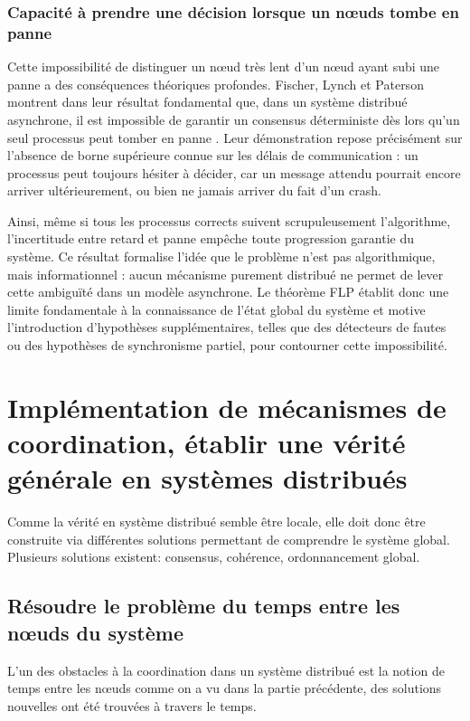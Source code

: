 \documentclass[12pt,a4paper]{article}
\begin{document}
\subsubsection{Capacité à prendre une décision lorsque un nœuds tombe en panne}

Cette impossibilité de distinguer un nœud très lent d’un nœud ayant subi une panne a des conséquences théoriques profondes. Fischer, Lynch et Paterson montrent dans leur résultat fondamental que, dans un système distribué asynchrone, il est impossible de garantir un consensus déterministe dès lors qu’un seul processus peut tomber en panne \cite{FLP1985}. Leur démonstration repose précisément sur l’absence de borne supérieure connue sur les délais de communication : un processus peut toujours hésiter à décider, car un message attendu pourrait encore arriver ultérieurement, ou bien ne jamais arriver du fait d’un crash.

Ainsi, même si tous les processus corrects suivent scrupuleusement l’algorithme, l’incertitude entre retard et panne empêche toute progression garantie du système. Ce résultat formalise l’idée que le problème n’est pas algorithmique, mais informationnel : aucun mécanisme purement distribué ne permet de lever cette ambiguïté dans un modèle asynchrone. Le théorème FLP établit donc une limite fondamentale à la connaissance de l’état global du système et motive l’introduction d’hypothèses supplémentaires, telles que des détecteurs de fautes ou des hypothèses de synchronisme partiel, pour contourner cette impossibilité.






\newpage
\section{Implémentation de mécanismes de coordination, établir une vérité générale en systèmes distribués}

Comme la vérité en système distribué semble être locale, elle doit donc être construite via différentes solutions permettant de comprendre le système global. Plusieurs solutions existent: consensus, cohérence, ordonnancement global.

\subsection{Résoudre le problème du temps entre les nœuds du système}

L'un des obstacles à la coordination dans un système distribué est la notion de temps entre les nœuds comme on a vu dans la partie précédente, des solutions nouvelles ont été trouvées à travers le temps.
\end{document}
